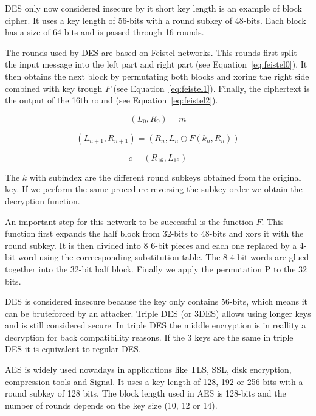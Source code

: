 DES only now considered insecure by it short key length is an example of block cipher.
It uses a key length of 56-bits with a round subkey of 48-bits.
Each block has a size of 64-bits and is passed through 16 rounds.

The rounds used by DES are based on Feistel networks.
This rounds first split the input message into the left part and right part (see Equation~\ref{eq:feistel0}).
It then obtains the next block by permutating both blocks and xoring the right side combined with key trough $F$ (see Equation~\ref{eq:feistel1}).
Finally, the ciphertext is the output of the 16th round (see Equation~\ref{eq:feistel2}).


\begin{equation}
  (L_0, R_0) = m
\label{eq:feistel0}
\end{equation}

\begin{equation}
  (L_{n+1}, R_{n+1}) = (R_n, L_n \oplus F(k_n, R_n))
\label{eq:feistel1}
\end{equation}

\begin{equation}
  c = (R_{16}, L_{16})
\label{eq:feistel2}
\end{equation}

The $k$ with subindex are the different round subkeys obtained from the original key.
If we perform the same procedure reversing the subkey order we obtain the decryption function.

An important step for this network to be successful is the function $F$.
This function first expands the half block from 32-bits to 48-bits and xors it with the round subkey.
It is then divided into 8 6-bit pieces and each one replaced by a 4-bit word using the correesponding substitution table.
The 8 4-bit words are glued together into the 32-bit half block.
Finally we apply the permutation P to the 32 bits.

DES is considered insecure because the key only contains 56-bits, which means it can be bruteforced by an attacker.
Triple DES (or 3DES) allows using longer keys and is still considered secure.
In triple DES the middle encryption is in reallity a decryption for back compatibility reasons.
If the 3 keys are the same in triple DES it is equivalent to regular DES.

AES is widely used nowadays in applications like TLS, SSL, disk encryption, compression tools and Signal.
It uses a key length of 128, 192 or 256 bits with a round subkey of 128 bits.
The block length used in AES is 128-bits and the number of rounds depends on the key size (10, 12 or 14).

